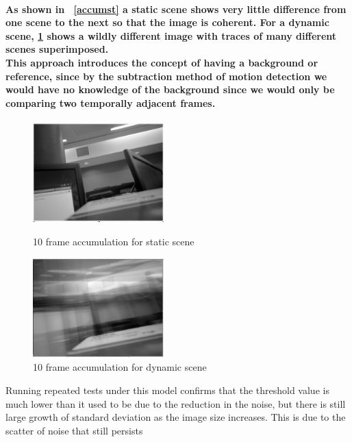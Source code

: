 \documentclass[11pt]{article} %
\begin{document}
\paragraph{As shown in ~\cref{accumst} a static scene shows very little difference from one scene to the next so that the image is coherent. For a dynamic scene, \cref{accumdy} shows a wildly different image with traces of many different scenes superimposed.
\\This approach introduces the concept of having a background or reference, since by the subtraction method of motion detection we would have no knowledge of the background since we would only be comparing two temporally adjacent frames.
}
\begin{figure}
	\vspace{-30pt}
	\begin{center}
		\includegraphics[width=0.45\textwidth]{../images/accumstatic}
	\end{center}
	\vspace{-20pt}
	\caption{10 frame accumulation for static scene}
	\label{accumst}
	\vspace{10pt}
	\begin{center}
		\includegraphics[width=0.45\textwidth]{../images/accumdynamic}
	\end{center}
	\vspace{-20pt}
	\caption{10 frame accumulation for dynamic scene}
	\label{accumdy}
	\vspace{30pt}
\end{figure}
Running repeated tests under this model confirms that the threshold value is much lower than it used to be due to the reduction in the noise, but there is still large growth of standard deviation as the image size increases. This is due to the scatter of noise that still persists 
\end{document}
